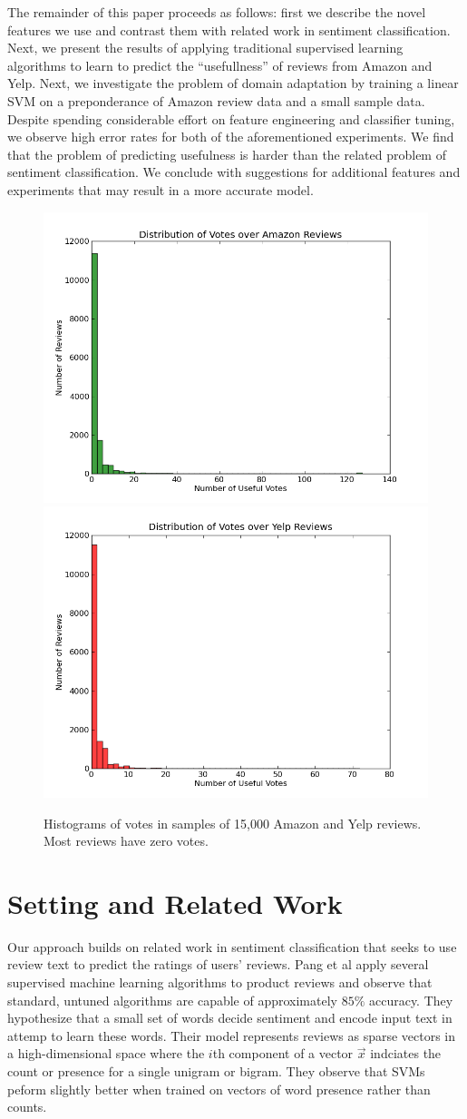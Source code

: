 \documentclass[letterpaper]{article}
\begin{document}
The remainder of this paper proceeds as follows: first we describe the novel 
features we use and contrast them with related work in sentiment 
classification.  Next, we present the results of applying traditional 
supervised learning algorithms to learn to predict the ``usefullness'' of 
reviews from Amazon and Yelp.  Next, we investigate the problem of domain 
adaptation by training a linear SVM on a preponderance of Amazon review data 
and a small sample data.  Despite spending considerable effort on feature 
engineering and classifier tuning, we observe high error rates for both of the 
aforementioned experiments.  We find that the problem of predicting usefulness 
is harder than the related problem of sentiment classification.  We conclude 
with suggestions for additional features and experiments that may result in a more accurate model.

\begin{figure}[h]
    \label{fig:vote-histos}
	\centering
	\includegraphics[width=0.30\linewidth]{amz_histo}
    \includegraphics[width=0.30\linewidth]{yelp_histo}
	\caption{Histograms of votes in samples of 15,000 Amazon and Yelp reviews.
    Most reviews have zero votes.}
\end{figure}

\section{Setting and Related Work}
Our approach builds on related work in sentiment classification that seeks to use 
review text to predict the ratings of users' reviews.  Pang et al \cite{PangSentimentClassification}
apply several supervised machine learning algorithms to product reviews and observe that 
standard, untuned algorithms are capable of approximately $85\%$ accuracy.  They hypothesize that
a small set of words decide sentiment and encode input text in attemp to learn these words. 
Their model represents reviews as sparse vectors in a high-dimensional space where the $i$th component 
of a vector $\vec{x}$ indciates the count or presence for a single unigram or bigram.  They observe
that SVMs peform slightly better when trained on vectors of word presence rather than counts.
\end{document}
